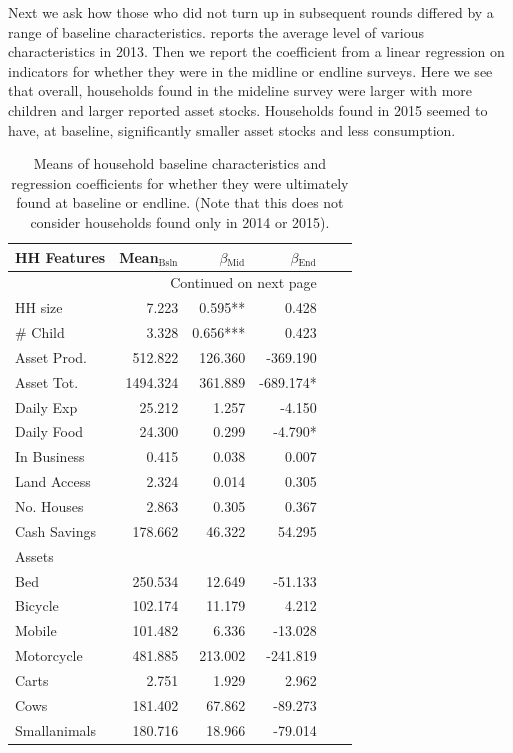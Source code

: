 \documentclass[12pt,article]{article}
\begin{document}
Next we ask how those who did not turn up in subsequent rounds differed by a range of
baseline characteristics.  reports the average level of
various characteristics in 2013. Then we report the coefficient from a linear
regression on indicators for whether they were in the midline or endline surveys.
Here we see that overall, households found in the mideline survey were larger with
more children and larger reported asset stocks. Households found in 2015 seemed to
have, at baseline, significantly smaller asset stocks and less consumption.

\begin{longtable}{lrrrrr}
\caption{\label{tab:attrition_balance}Means of household baseline characteristics and regression coefficients for whether they were ultimately found at baseline or endline. (Note that this does not consider households found only in 2014 or 2015).}
\\
\hline
HH Features & Mean$_{\text{Bsln}}$ & $\beta$$_{\text{Mid}}$ & $\beta$$_{\text{End}}$\\
\hline
\endhead
\hline\multicolumn{4}{r}{Continued on next page} \\
\endfoot
\endlastfoot
HH size & 7.223 & 0.595** & 0.428\\
\# Child & 3.328 & 0.656*** & 0.423\\
Asset Prod. & 512.822 & 126.360 & -369.190\\
Asset Tot. & 1494.324 & 361.889 & -689.174*\\
Daily Exp & 25.212 & 1.257 & -4.150\\
Daily Food & 24.300 & 0.299 & -4.790*\\
In Business & 0.415 & 0.038 & 0.007\\
Land Access & 2.324 & 0.014 & 0.305\\
No. Houses & 2.863 & 0.305 & 0.367\\
Cash Savings & 178.662 & 46.322 & 54.295\\
\hline
Assets &  &  & \\
\hline
Bed & 250.534 & 12.649 & -51.133\\
Bicycle & 102.174 & 11.179 & 4.212\\
Mobile & 101.482 & 6.336 & -13.028\\
Motorcycle & 481.885 & 213.002 & -241.819\\
Carts & 2.751 & 1.929 & 2.962\\
Cows & 181.402 & 67.862 & -89.273\\
Smallanimals & 180.716 & 18.966 & -79.014\\

\end{longtable}
\end{document}
